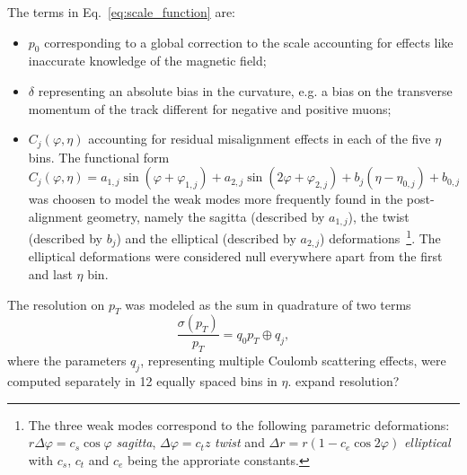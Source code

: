 The terms in Eq.~\ref{eq:scale_function} are:
\begin{itemize}
\item $p_0$ corresponding to a global correction to the scale accounting for effects
  like inaccurate knowledge of the magnetic field;
\item $\delta$ representing an absolute bias in the curvature, e.g. a
  bias on the transverse momentum of the track different for negative
  and positive muons;
\item $C_j(\varphi,\eta)$ accounting for residual misalignment effects
  in each of the five $\eta$ bins.
  The functional form 
  \[
  C_j(\varphi,\eta) = a_{1,j} \sin(\varphi+\varphi_{1,j}) + a_{2,j}
  \sin(2\varphi+\varphi_{2,j}) + b_j(\eta-\eta_{0,j}) + b_{0,j} 
  \]
  was choosen to model the weak modes more frequently
  found in the post-alignment geometry, namely the sagitta (described
  by $a_{1,j}$), the
  twist (described by $b_j$) and the elliptical (described
  by $a_{2,j}$) deformations~\footnote{
    The three weak modes correspond to the following parametric deformations:
    $r\Delta\varphi = c_s \cos\varphi$ {\sl sagitta},
    $\Delta\varphi = c_t z$  {\sl twist} and 
    $\Delta r = r (1- c_e \cos 2\varphi) $  {\sl elliptical}
    with $c_s$, $c_t$ and $c_e$ being the approriate constants.}. 
  The elliptical deformations were considered null everywhere apart from 
  the first and last $\eta$ bin.
\end{itemize}
The resolution on $p_T$ was modeled as the sum in quadrature of two terms
\begin{equation}
\frac{\sigma(p_T)}{p_T}=q_0 p_T \oplus q_j ,
\label{eq:resolution_function}
\end{equation}
where the parameters $q_j$, representing multiple Coulomb scattering
effects, were computed separately in 12 equally spaced bins in $\eta$. 
\FIXME expand resolution? 
